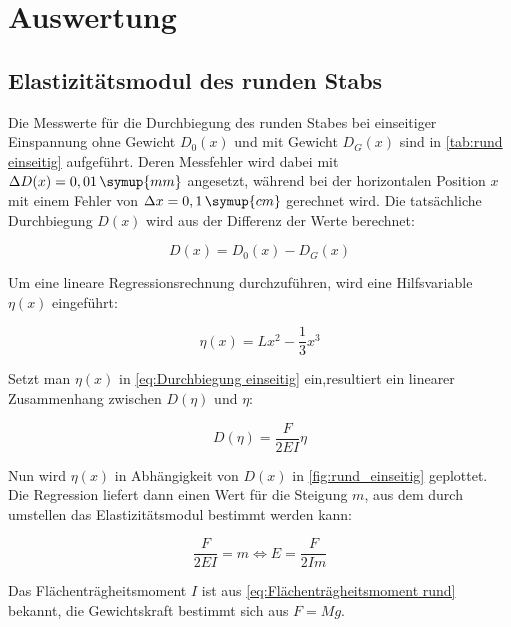 \section{Auswertung}
\label{sec:Auswertung}

\subsection{Elastizitätsmodul des runden Stabs}  %
\label{sec:Elastizitätsmodul rund}

Die Messwerte für die Durchbiegung des runden Stabes bei einseitiger Einspannung ohne Gewicht $D_{0}(x)$
und mit Gewicht $D_{G}(x)$ sind in \autoref{tab:rund einseitig} aufgeführt.
Deren Messfehler wird dabei mit $\Delta D(x) =  0,01\,\symup{mm}$ angesetzt, während bei der horizontalen Position
$x$ mit einem Fehler von $\Delta x = 0,1\,\symup{cm}$ gerechnet wird.
Die tatsächliche Durchbiegung $D(x)$ wird aus der Differenz der Werte berechnet:

\begin{equation}
  D(x)= D_{0}(x)-D_{G}(x)
  \label{eq:Delta D}
\end{equation}


Um eine lineare Regressionsrechnung durchzuführen, wird eine Hilfsvariable $\eta(x)$ eingeführt:

\begin{equation}
  \eta(x)=Lx^{2}-\frac{1}{3}x^{3}
  \label{eq:eta einseitig rund}
\end{equation}

Setzt man $\eta(x)$ in \autoref{eq:Durchbiegung einseitig} ein,resultiert ein linearer Zusammenhang zwischen $D(\eta)$ und $\eta$:

\begin{equation}
  D(\eta)=\frac{F}{2EI}\eta
  \label{eq:Geradengleichung}
\end{equation}

Nun wird $\eta(x)$ in Abhängigkeit von $D(x)$ in \autoref{fig:rund_einseitig} geplottet.
Die Regression liefert dann einen Wert für die Steigung $m$, aus dem durch umstellen das Elastizitätsmodul bestimmt werden kann:

\begin{equation}
  \frac{F}{2EI}=m \Leftrightarrow E=\frac{F}{2Im}
  \label{eq:Elastizitätsmodul aus Steigung}
\end{equation}

Das Flächenträgheitsmoment $I$ ist aus \autoref{eq:Flächenträgheitsmoment rund} bekannt, die Gewichtskraft
bestimmt sich aus $F=Mg$.

